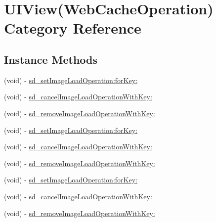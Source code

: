 \hypertarget{category_u_i_view_07_web_cache_operation_08}{}\section{U\+I\+View(Web\+Cache\+Operation) Category Reference}
\label{category_u_i_view_07_web_cache_operation_08}
\subsection*{Instance Methods}
\begin{DoxyCompactItemize}
\item 
(void) -\/ \mbox{\hyperlink{category_u_i_view_07_web_cache_operation_08_a0ac55cce0483704f3a3aeda220469663}{sd\+\_\+set\+Image\+Load\+Operation\+:for\+Key\+:}}
\item 
(void) -\/ \mbox{\hyperlink{category_u_i_view_07_web_cache_operation_08_af17683683b26e9084ac63f5cf7f66add}{sd\+\_\+cancel\+Image\+Load\+Operation\+With\+Key\+:}}
\item 
(void) -\/ \mbox{\hyperlink{category_u_i_view_07_web_cache_operation_08_ac2791e01e33c9b0211190ce64d9c1283}{sd\+\_\+remove\+Image\+Load\+Operation\+With\+Key\+:}}
\item 
(void) -\/ \mbox{\hyperlink{category_u_i_view_07_web_cache_operation_08_a0ac55cce0483704f3a3aeda220469663}{sd\+\_\+set\+Image\+Load\+Operation\+:for\+Key\+:}}
\item 
(void) -\/ \mbox{\hyperlink{category_u_i_view_07_web_cache_operation_08_af17683683b26e9084ac63f5cf7f66add}{sd\+\_\+cancel\+Image\+Load\+Operation\+With\+Key\+:}}
\item 
(void) -\/ \mbox{\hyperlink{category_u_i_view_07_web_cache_operation_08_ac2791e01e33c9b0211190ce64d9c1283}{sd\+\_\+remove\+Image\+Load\+Operation\+With\+Key\+:}}
\item 
(void) -\/ \mbox{\hyperlink{category_u_i_view_07_web_cache_operation_08_a0ac55cce0483704f3a3aeda220469663}{sd\+\_\+set\+Image\+Load\+Operation\+:for\+Key\+:}}
\item 
(void) -\/ \mbox{\hyperlink{category_u_i_view_07_web_cache_operation_08_af17683683b26e9084ac63f5cf7f66add}{sd\+\_\+cancel\+Image\+Load\+Operation\+With\+Key\+:}}
\item 
(void) -\/ \mbox{\hyperlink{category_u_i_view_07_web_cache_operation_08_ac2791e01e33c9b0211190ce64d9c1283}{sd\+\_\+remove\+Image\+Load\+Operation\+With\+Key\+:}}
\end{DoxyCompactItemize}


